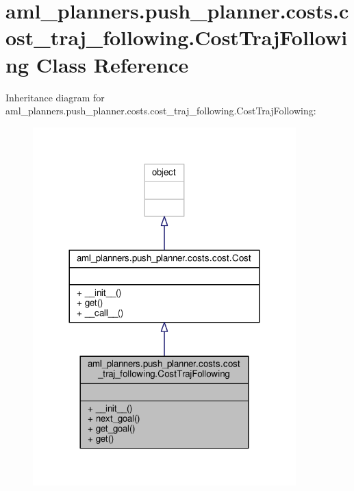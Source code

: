 \hypertarget{classaml__planners_1_1push__planner_1_1costs_1_1cost__traj__following_1_1_cost_traj_following}{\section{aml\-\_\-planners.\-push\-\_\-planner.\-costs.\-cost\-\_\-traj\-\_\-following.\-Cost\-Traj\-Following Class Reference}
\label{classaml__planners_1_1push__planner_1_1costs_1_1cost__traj__following_1_1_cost_traj_following}
}


Inheritance diagram for aml\-\_\-planners.\-push\-\_\-planner.\-costs.\-cost\-\_\-traj\-\_\-following.\-Cost\-Traj\-Following\-:\nopagebreak
\begin{figure}[H]
\begin{center}
\leavevmode
\includegraphics[width=288pt]{classaml__planners_1_1push__planner_1_1costs_1_1cost__traj__following_1_1_cost_traj_following__inherit__graph}
\end{center}
\end{figure}


